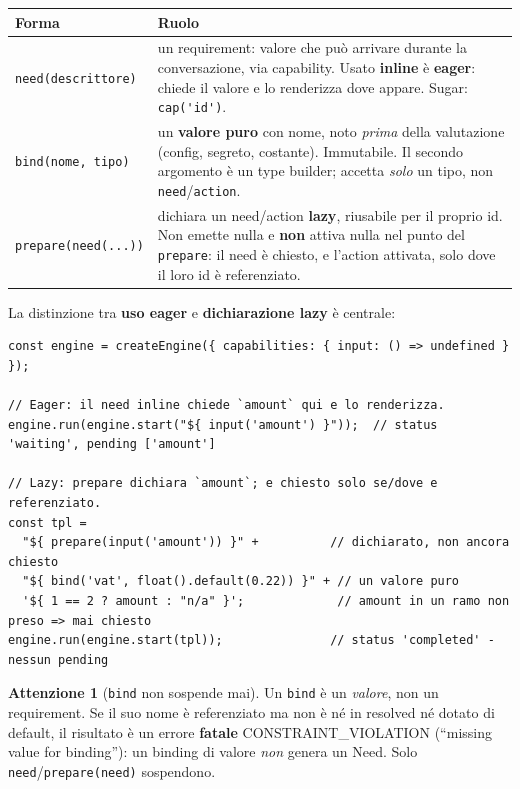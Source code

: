 \documentclass[11pt,a4paper]{book}
\let\code\lstinline
\newcommand{\ic}[1]{{\ttfamily #1}}
\theoremstyle{definition}
\newtheorem*{attenzione}{Attenzione}
\begin{document}
{{{{\begin{center}
\small
\begin{tabular}{@{}l p{10cm}@{}}
\toprule
\textbf{Forma} & \textbf{Ruolo} \\
\midrule
\code|need(descrittore)| & un requirement: valore che può arrivare durante la
conversazione, via capability. Usato \textbf{inline} è \textbf{eager}: chiede il
valore e lo renderizza dove appare. Sugar: \code|cap('id')|. \\
\code|bind(nome, tipo)| & un \textbf{valore puro} con nome, noto \emph{prima} della
valutazione (config, segreto, costante). Immutabile. Il secondo argomento è un
type builder; accetta \emph{solo} un tipo, non \code|need|/\code|action|. \\
\code|prepare(need(...))| & dichiara un need/action \textbf{lazy}, riusabile per il
proprio \ic{id}. Non emette nulla e \textbf{non} attiva nulla nel punto del
\code|prepare|: il need è chiesto, e l'action attivata, solo dove il loro \ic{id} è
referenziato. \\
\bottomrule
\end{tabular}
\end{center}

La distinzione tra \textbf{uso eager} e \textbf{dichiarazione lazy} è centrale:

\begin{lstlisting}
const engine = createEngine({ capabilities: { input: () => undefined } });

// Eager: il need inline chiede `amount` qui e lo renderizza.
engine.run(engine.start("${ input('amount') }"));  // status 'waiting', pending ['amount']

// Lazy: prepare dichiara `amount`; e chiesto solo se/dove e referenziato.
const tpl =
  "${ prepare(input('amount')) }" +          // dichiarato, non ancora chiesto
  "${ bind('vat', float().default(0.22)) }" + // un valore puro
  '${ 1 == 2 ? amount : "n/a" }';             // amount in un ramo non preso => mai chiesto
engine.run(engine.start(tpl));               // status 'completed' - nessun pending
\end{lstlisting}

\begin{attenzione}[\texttt{bind} non sospende mai]
Un \code|bind| è un \emph{valore}, non un requirement. Se il suo nome è
referenziato ma non è né in \ic{resolved} né dotato di \ic{default}, il risultato è
un errore \textbf{fatale} \ic{CONSTRAINT\_VIOLATION} (``missing value for
binding''): un binding di valore \emph{non} genera un \ic{Need}. Solo
\code|need|/\code|prepare(need)| sospendono.
\end{attenzione}

}}}}
\end{document}
